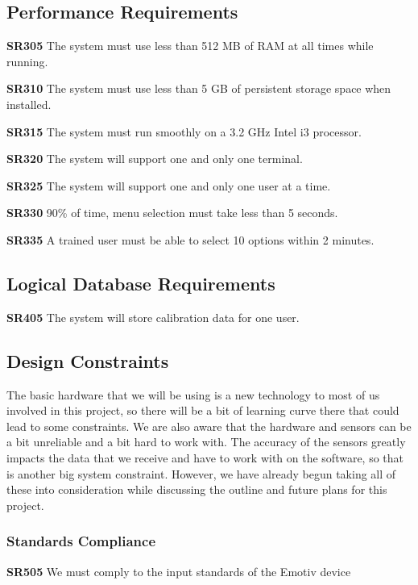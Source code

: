 \documentclass{article}
\begin{document}
\subsection{Performance Requirements}

\textbf{SR305} The system must use less than 512 MB of RAM at all times while running.

\textbf{SR310} The system must use less than 5 GB of persistent storage space when installed.

\textbf{SR315} The system must run smoothly on a 3.2 GHz Intel i3 processor.

\textbf{SR320} The system will support one and only one terminal.

\textbf{SR325} The system will support one and only one user at a time.

\textbf{SR330} 90\% of time, menu selection must take less than 5 seconds.

\textbf{SR335} A trained user must be able to select 10 options within 2
minutes.

\subsection{Logical Database Requirements}

\textbf{SR405} The system will store calibration data for one user.

\subsection{Design Constraints}

The basic hardware that we will be using is a new technology to most of us involved in this project, so there will be a bit of learning curve there that could lead to some constraints. We are also aware that the hardware and sensors can be a bit unreliable and a bit hard to work with. The accuracy of the sensors greatly impacts the data that we receive and have to work with on the software, so that is another big system constraint. However, we have already begun taking all of these into consideration while discussing the outline and future plans for this project. 

\subsubsection{Standards Compliance}

\textbf{SR505} We must comply to the input standards of the Emotiv device 
\end{document}
